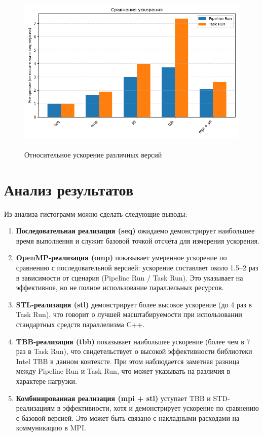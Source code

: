 \documentclass[12pt,a4paper]{article}
\begin{document}
\begin{figure}[H]
\centering
\includegraphics[height=8cm]{img/perf_stat_info_2.png}
\caption{\label{fig:visualClass} Относительное ускорение различных версий}
\end{figure}

\section{Анализ результатов}
Из анализа гистограмм можно сделать следующие выводы:

\begin{enumerate}
  \item \textbf{Последовательная реализация (seq)} ожидаемо демонстрирует наибольшее время выполнения и служит базовой точкой отсчёта для измерения ускорения.

  \item \textbf{OpenMP-реализация (omp)} показывает умеренное ускорение по сравнению с последовательной версией: ускорение составляет около 1.5--2 раз в зависимости от сценария (Pipeline Run / Task Run). Это указывает на эффективное, но не полное использование параллельных ресурсов.

  \item \textbf{STL-реализация (stl)} демонстрирует более высокое ускорение (до 4 раз в Task Run), что говорит о лучшей масштабируемости при использовании стандартных средств параллелизма C++.

  \item \textbf{TBB-реализация (tbb)} показывает наибольшее ускорение (более чем в 7 раз в Task Run), что свидетельствует о высокой эффективности библиотеки Intel TBB в данном контексте. При этом наблюдается заметная разница между Pipeline Run и Task Run, что может указывать на различия в характере нагрузки.

  \item \textbf{Комбинированная реализация (mpi + stl)} уступает TBB и STD-реализациям в эффективности, хотя и демонстрирует ускорение по сравнению с базовой версией. Это может быть связано с накладными расходами на коммуникацию в MPI.

\end{enumerate}
\end{document}
